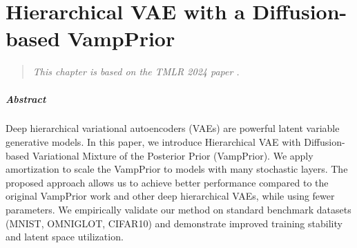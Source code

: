 





\chapter{Hierarchical VAE with a Diffusion-based VampPrior}\label{chap:dvp}


\begin{verse}
\textit{
\hfill This chapter is based on the TMLR 2024 paper \citep{kuzina2024hierarchical}.
} 
\end{verse}

\paragraph{Abstract}
Deep hierarchical variational autoencoders (VAEs) are powerful latent variable generative models. 
In this paper, we introduce Hierarchical VAE with Diffusion-based Variational Mixture of the Posterior Prior (VampPrior).
We apply amortization to scale the VampPrior to models with many stochastic layers. 
The proposed approach allows us to  achieve better performance compared to the original VampPrior work and other deep hierarchical VAEs, while using fewer parameters.
We empirically validate our method on standard benchmark datasets (MNIST, OMNIGLOT, CIFAR10) and demonstrate improved training stability and latent space utilization.
\newpage





% 










